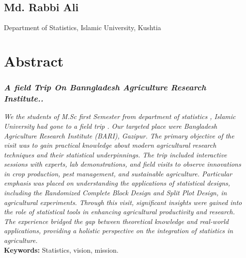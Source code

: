 \documentclass[oneside,12pt,fleqn]{book}
\begin{document}
\section*{Md. Rabbi Ali}
Department of Statistics, Islamic University, Kushtia


\chapter*{Abstract}
\subsection*{\textit{A field Trip On Banngladesh Agriculture Research Institute..}}
\textit{We the students of M.Sc first Semester from department of statistics , Islamic University had gone to a field trip . Our targeted place were Bangladesh Agriculture  Research Institute (BARI), Gazipur. The primary objective of the visit was to gain practical knowledge about modern agricultural research techniques and their statistical underpinnings. The trip included interactive sessions with experts, lab demonstrations, and field visits to observe innovations in crop production, pest management, and sustainable agriculture. Particular emphasis was placed on understanding the applications of statistical designs, including the Randomized Complete Block Design and Split Plot Design, in agricultural experiments.
Through this visit, significant insights were gained into the role of statistical tools in enhancing agricultural productivity and research. The experience bridged the gap between theoretical knowledge and real-world applications, providing a holistic perspective on the integration of statistics in agriculture.\\}
\textbf{Keywords: }Statistics, vision, mission.

\end{document}
